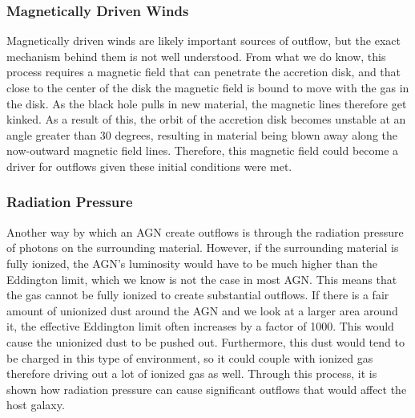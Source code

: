 \documentclass[12pt]{article}
\begin{document}
    \subsubsection{Magnetically Driven Winds}
    Magnetically driven winds are likely important sources of outflow, but
    the exact mechanism behind them is not well understood.  From what we do
    know, this process requires a magnetic field that can penetrate the
    accretion disk, and that close to the center of the disk the magnetic field
    is bound to move with the gas in the disk.  As the black hole pulls in new
    material, the magnetic lines therefore get kinked.  As a result of this, the
    orbit of the accretion disk becomes unstable at an angle greater than 30
    degrees, resulting in material being blown away along the now-outward
    magnetic field lines.  Therefore, this magnetic field could become a driver
    for outflows given these initial conditions were met.

    \subsubsection{Radiation Pressure}
    Another way by which an AGN create outflows is through the radiation
    pressure of photons on
    the surrounding material.  However, if the surrounding material is fully
    ionized, the AGN's luminosity would have to be much higher than the
    Eddington limit, which we know is not the case in most AGN.  This means that
    the gas cannot be fully ionized to create substantial outflows.  If there is
    a fair amount of unionized dust around the AGN and we look at a larger area
    around it, the effective Eddington limit often increases by a factor of
    1000.  This would cause the unionized dust to be pushed out.  Furthermore,
    this dust would tend to be charged in this type of environment, so it could
    couple with ionized gas therefore driving out a lot of ionized gas as well.
    Through this process, it is shown how radiation pressure can cause
    significant outflows that would affect the host galaxy.
\end{document}
